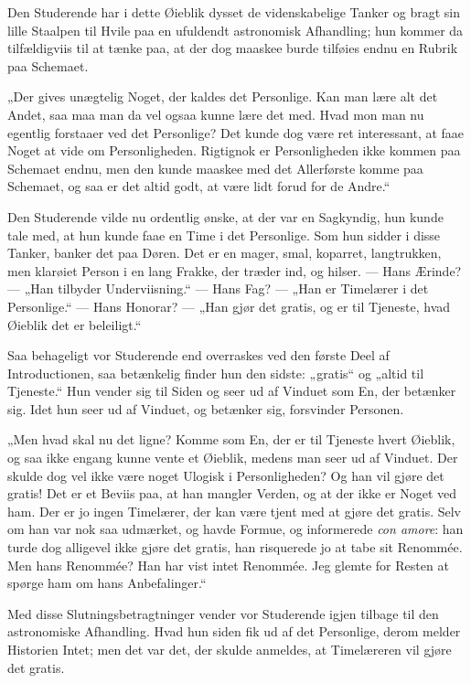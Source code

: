 \documentclass[12pt,a4paper]{book}
\newcommand{\apage}[1]{\marginnote{\footnotesize\textit{[#1]}}}
\begin{document}
Den Studerende har i dette Øieblik dysset de videnskabelige Tanker
og bragt sin lille Staalpen til Hvile paa en ufuldendt astronomisk
Afhandling; hun kommer da tilfældigviis til at tænke paa, at der
dog maaskee burde tilføies endnu en Rubrik paa Schemaet.

„Der gives unægtelig Noget, der kaldes det Personlige. Kan man lære
alt det Andet, saa maa man da vel ogsaa kunne lære det med. Hvad
mon man nu egentlig forstaaer ved det Personlige? Det kunde dog
være ret interessant, at faae Noget at vide om Personligheden.
Rigtignok er Personligheden ikke kommen paa Schemaet endnu, men den
kunde maaskee med det Allerførste komme paa Schemaet, og saa er det
altid godt, at være lidt forud for de Andre.“

Den Studerende vilde nu ordentlig ønske, at der var en Sagkyndig,
hun kunde tale med, at hun kunde faae en \apage{84} Time
i det Personlige. Som hun sidder i disse Tanker, banker det paa
Døren. Det er en mager, smal, koparret, langtrukken, men klarøiet
Person i en lang Frakke, der træder ind, og hilser. --- Hans
Ærinde? --- „Han tilbyder Underviisning.“ --- Hans Fag? --- „Han er
Timelærer i det Personlige.“ --- Hans Honorar? --- „Han gjør det
gratis, og er til Tjeneste, hvad Øieblik det er beleiligt.“

Saa behageligt vor Studerende end overraskes ved den første Deel af
Introductionen, saa betænkelig finder hun den sidste: „gratis“ og
„altid til Tjeneste.“ Hun vender sig til Siden og seer ud af
Vinduet som En, der betænker sig. Idet hun seer ud af Vinduet, og
betænker sig, forsvinder Personen.

„Men hvad skal nu det ligne? Komme som En, der er til Tjeneste
hvert Øieblik, og saa ikke engang kunne vente et Øieblik, medens
man seer ud af Vinduet. Der skulde dog vel ikke være noget Ulogisk
i Personligheden? Og han vil gjøre det gratis! Det er et Beviis
paa, at han mangler Verden, og at der ikke er Noget ved ham. Der er
jo ingen Timelærer, der kan være tjent med at gjøre det gratis.
Selv om han var nok saa udmærket, og havde Formue, og informerede
\textit{con amore}: han turde dog alligevel ikke gjøre det gratis,
han risquerede jo at tabe sit Renommée. Men hans Renommée? Han har
vist intet Renommée. Jeg glemte for Resten at spørge ham om hans
Anbefalinger.“

Med disse Slutningsbetragtninger vender vor Studerende igjen
tilbage til den astronomiske Afhandling. Hvad hun siden fik ud af
det Personlige, derom melder Historien Intet; men det var det, der
skulde anmeldes, at Timelæreren vil gjøre det gratis.
\end{document}
